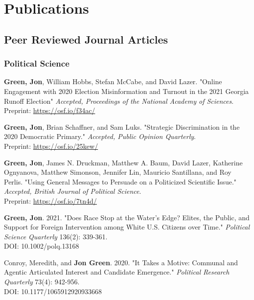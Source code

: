 \documentclass[letterpaper]{article}
\begin{document}
\section*{Publications}

\subsection*{Peer Reviewed Journal Articles}

\subsubsection*{Political Science}

\begin{etaremune}

\item  \textbf{Green, Jon}, William Hobbs, Stefan McCabe, and David Lazer. "Online Engagement with 2020 Election Misinformation and Turnout in the 2021 Georgia Runoff Election"  \textit{Accepted, Proceedings of the National Academy of Sciences}.\\
Preprint: \url{https://osf.io/f34ac/}

\item \textbf{Green, Jon}, Brian Schaffner, and Sam Luks. "Strategic Discrimination in the 2020 Democratic Primary."  \textit{Accepted, Public Opinion Quarterly}.\\
Preprint: \url{https://osf.io/25kew/}

\item  \textbf{Green, Jon}, James N. Druckman, Matthew A. Baum, David Lazer, Katherine Ognyanova, Matthew Simonson, Jennifer Lin, Mauricio Santillana, and Roy Perlis. "Using General Messages to Persuade on a Politicized Scientific Issue." \textit{Accepted, British Journal of Political Science}. \\
Preprint:  \url{https://osf.io/7tn4d/}

\item \textbf{Green, Jon}. 2021. "Does Race Stop at the Water's Edge? Elites, the Public, and Support for Foreign Intervention among White U.S. Citizens over Time." \textit{Political Science Quarterly} 136(2): 339-361. \\
DOI: 10.1002/polq.13168

\item Conroy, Meredith, and \textbf{Jon Green}. 2020. "It Takes a Motive: Communal and Agentic Articulated Interest and Candidate Emergence."  \textit{Political Research Quarterly} 73(4): 942-956. \\
DOI: 10.1177/1065912920933668


\end{etaremune}
\end{document}
